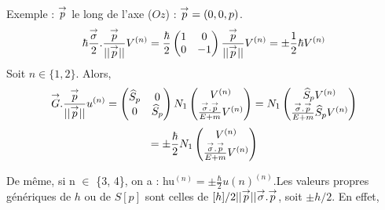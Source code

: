 Exemple : ${\overset{\rightarrow}{p}}$ le long de l’axe ($Oz$) : ${\overset{\rightarrow}{p}} = (0, 0, p)$.
\[
\hbar\frac{{\overset{\rightarrow}{\sigma}}}{2}.\frac{{\overset{\rightarrow}{p}}}{||{\overset{\rightarrow}{p}}||}V^{(n)}=\frac{\hbar}{2}
\begin{pmatrix}1&0\\0&-1\end{pmatrix}\frac{{\overset{\rightarrow}{p}}}{||{\overset{\rightarrow}{p}}||}V^{(n)}=
\pm\frac{1}{2}\hbar V^{(n)}
\]
Soit $n \in \{1, 2\}$. Alors,
\[
{\overset{\rightarrow}{G}}.\frac{{\overset{\rightarrow}{p}}}{||{\overset{\rightarrow}{p}}||}u^{(n)}=
\begin{pmatrix}\widehat{S}_p&0\\0&\widehat{S}_p\end{pmatrix}N_1
\begin{pmatrix}V^{(n)}\\\frac{{\overset{\rightarrow}{\sigma}}.{\overset{\rightarrow}{p}}}{E+m}V^{(n)}\end{pmatrix}=N_1
\begin{pmatrix}\widehat{S}_pV^{(n)}\\\frac{{\overset{\rightarrow}{\sigma}}.{\overset{\rightarrow}{p}}}{E+m}\widehat{S}_pV^{(n)}\end{pmatrix}
\]
\[
=\pm\frac{\hbar}{2}N_1
\begin{pmatrix}V^{(n)}\\\frac{{\overset{\rightarrow}{\sigma}}.{\overset{\rightarrow}{p}}}{E+m}V^{(n)}\end{pmatrix}
\]

De même, si n $\in$ \{3, 4\}, on a : hu$^{(n)} = \pm \frac{\hbar}{2}u(n)^{(n)}$.Les
valeurs propres génériques de $h$ ou de $S[p]$ sont celles de
$[h]/2||{\overset{\rightarrow}{p}}||{\overset{\rightarrow}{\sigma}}.{\overset{\rightarrow}{p}}$, soit $\pm h/2$. En effet,


